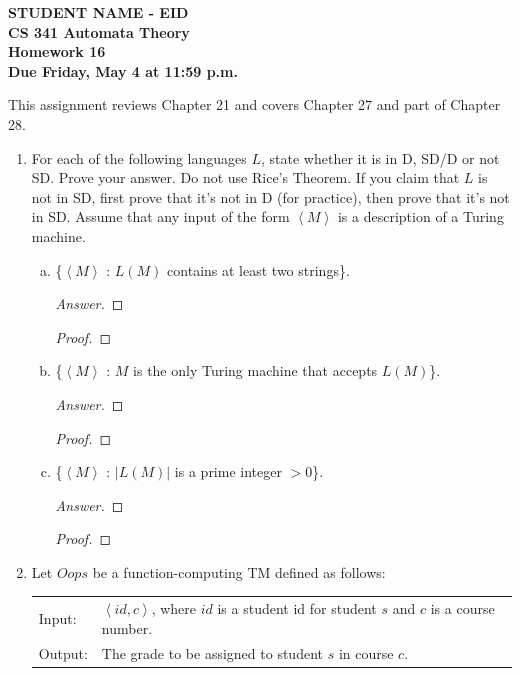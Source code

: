 \documentclass[10pt]{article}
\newcommand{\card}[1]{\left| #1 \right|}
\newcommand{\brackets}[1]{\left< #1 \right>}
\begin{document}
\begin{flushleft}
\textbf{\noindent
STUDENT NAME - EID\\
CS 341 Automata Theory \\
Homework 16 \\
Due Friday, May 4 at 11:59 p.m.}\\
\end{flushleft}

\noindent
This assignment reviews Chapter 21 and covers Chapter 27 and part of Chapter 28.\\

\begin{enumerate}[1)]


\item
For each of the following languages $L$, state whether it is in D, SD/D or not SD.  Prove your answer.  Do not use
Rice’s Theorem.  If you claim that $L$ is not in SD, first prove that it’s not in D (for practice), then prove that it’s not
in SD.  Assume that any input of the form $\brackets{M}$ is a description of a Turing machine.
\begin{enumerate}[a)]
\item
\{$\brackets{M}$ : $L(M)$ contains at least two strings\}.
\begin{proof}[Answer]
\end{proof}
\begin{proof}[Proof]
\end{proof}
\item
\{$\brackets{M}$ : $M$ is the only Turing machine that accepts $L(M)$\}.
\begin{proof}[Answer]
\end{proof}
\begin{proof}[Proof]
\end{proof}
\item
\{$\brackets{M}$ : $\card{L(M)}$ is a prime integer $> 0$\}.
\begin{proof}[Answer]
\end{proof}
\begin{proof}[Proof]
\end{proof}
\end{enumerate}


\item
Let $Oops$ be a function-computing TM defined as follows:
\begin{center}
\begin{tabular}{p{2cm} l}
Input:&$\brackets{id, c}$, where $id$ is a student id for student $s$ and $c$ is a course number.\\
Output:&The grade to be assigned to student $s$ in course $c$.
\end{tabular}
\end{center}


\end{enumerate}
\end{document}
